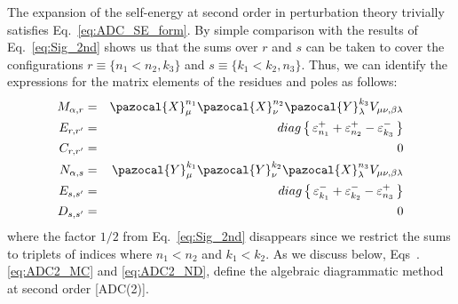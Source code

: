 The expansion of the self-energy at second order in perturbation theory trivially satisfies Eq.~\eqref{eq:ADC_SE_form}. By simple comparison with the results  of Eq.~\eqref{eq:Sig_2nd} shows us that the sums over $r$ and $s$ can be taken to cover the configurations $r\equiv\{n_1 < n_2,k_3\}$ and  $s\equiv\{k_1 < k_2, n_3\}$. Thus, we can identify the expressions for the matrix elements of the residues and poles as follows:
\begin{eqnarray}
 M_{\alpha,r} &=& %
     \pazocal{X}^{n_1}_\mu \pazocal{X}^{n_2}_\nu  \pazocal{Y}^{k_3}_\lambda  V_{\mu \nu, \beta \lambda}
 \nonumber \\
 E_{r,r'} &=& diag \left\{ \,\varepsilon^+_{n_1} + \varepsilon^+_{n_2} - \varepsilon^-_{k_3}  \, \right\}
 \nonumber \\
 C_{r,r'} &=& 0
 \label{eq:ADC2_MC}
   \\
 N_{\alpha,s} &=& \pazocal{Y}^{k_1}_\mu \pazocal{Y}^{k_2}_\nu \pazocal{X}^{n_3}_\lambda  V_{\mu \nu, \beta \lambda}
 \nonumber \\
 E_{s,s'} &=& diag \left\{ \, \varepsilon^-_{k_1} + \varepsilon^-_{k_2} - \varepsilon^+_{n_3} \, \right\} 
 \nonumber \\
 D_{s,s'} &=& 0
  \label{eq:ADC2_ND}
\end{eqnarray}
where the factor $1/2$ from Eq.~\eqref{eq:Sig_2nd} disappears since we restrict the sums to triplets of indices where  $n_1<n_2$ and $k_1<k_2$.
As we discuss below, Eqs~.\eqref{eq:ADC2_MC} and \eqref{eq:ADC2_ND}, define the algebraic diagrammatic method
at second order [ADC(2)].


